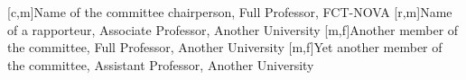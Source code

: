 [c,m]{Name of the committee chairperson, Full Professor, FCT-NOVA}
[r,m]{Name of a rapporteur, Associate Professor, Another University}
[m,f]{Another member of the committee, Full Professor, Another University}
[m,f]{Yet another member of the committee, Assistant Professor, Another University}
